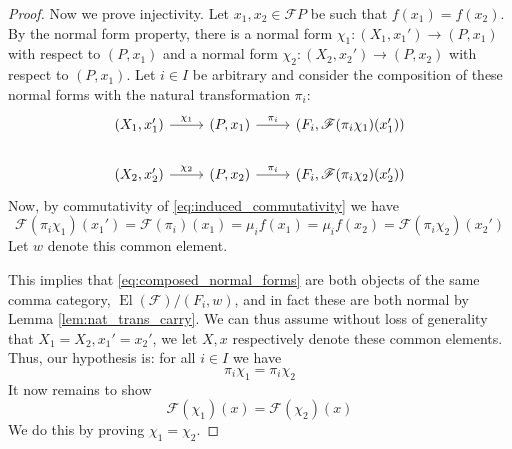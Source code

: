 \documentclass[12pt]{article}
\theoremstyle{plain}
\theoremstyle{definition}
\newcommand{\scr}[1]{\mathscr{#1}}
\newcommand{\lto}{\longrightarrow}
\begin{document}
\begin{proof}
		Now we prove injectivity. Let $x_1,x_2 \in \scr{F}P$ be such that $f(x_1) = f(x_2)$. By the normal form property, there is a normal form $\chi_1: (X_1, x_1') \lto (P, x_1)$ with respect to $(P,x_1)$ and a normal form $\chi_2: (X_2, x_2') \lto (P, x_2)$ with respect to $(P,x_1)$. Let $i \in I$ be arbitrary and consider the composition of these normal forms with the natural transformation $\pi_i$:
		\begin{equation}\label{eq:composed_normal_forms}
			\begin{tikzcd}
				(X_1,x_1')\arrow[r,"{\chi_1}"] & (P, x_1)\arrow[r,"{\pi_i}"] & (F_i, \scr{F}(\pi_i \chi_1)(x_1'))\\
				(X_2,x_2')\arrow[r,"{\chi_2}"] & (P, x_2)\arrow[r,"{\pi_i}"] & (F_i, \scr{F}(\pi_i \chi_2)(x_2'))
				\end{tikzcd}
			\end{equation}
		Now, by commutativity of \eqref{eq:induced_commutativity} we have
		\begin{equation}
			\scr{F}(\pi_i \chi_1)(x_1') = \scr{F}(\pi_i)(x_1) = \mu_i f(x_1) = \mu_if(x_2) = \scr{F}(\pi_i \chi_2)(x_2')
			\end{equation}
		Let $w$ denote this common element.
		
		This implies that \eqref{eq:composed_normal_forms} are both objects of the same comma category, $\operatorname{El}(\scr{F})/(F_i, w)$, and in fact these are both normal by Lemma \ref{lem:nat_trans_carry}. We can thus assume without loss of generality that $X_1 = X_2, x_1' = x_2'$, we let $X,x$ respectively denote these common elements. Thus, our hypothesis is: for all $i \in I$ we have
		\begin{equation}\label{eq:epi_would_be_nice}
			\pi_i\chi_1 = \pi_i\chi_2
			\end{equation}
		It now remains to show 
		\begin{equation}
			\scr{F}(\chi_1)(x) = \scr{F}(\chi_2)(x)
			\end{equation}
		We do this by proving $\chi_1 = \chi_2$.
		

\end{proof}
\end{document}
